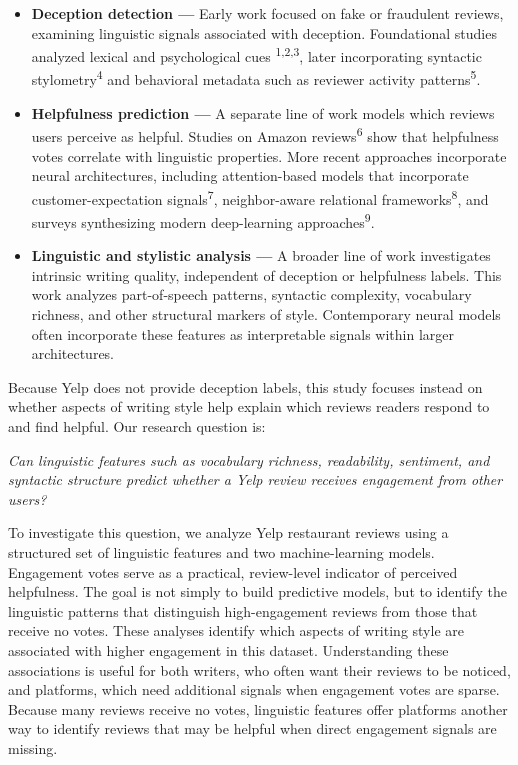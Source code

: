 \documentclass[12pt]{article}
\begin{document}
\begin{itemize}

  
\item \textbf{Deception detection —}
Early work focused on fake or fraudulent reviews, examining linguistic signals associated with deception. Foundational studies analyzed lexical and psychological cues \textsuperscript{1,2,3}, 
later incorporating syntactic stylometry\textsuperscript{4} and behavioral metadata such as reviewer activity patterns\textsuperscript{5}.

\item \textbf{Helpfulness prediction —}  
A separate line of work models which reviews users perceive as helpful. 
Studies on Amazon reviews\textsuperscript{6} show that helpfulness votes correlate with linguistic properties. 
More recent approaches incorporate neural architectures, including attention-based models that incorporate customer-expectation signals\textsuperscript{7},  
neighbor-aware relational frameworks\textsuperscript{8}, and surveys synthesizing modern deep-learning approaches\textsuperscript{9}.

\item \textbf{Linguistic and stylistic analysis —}  
A broader line of work investigates intrinsic writing quality, independent of deception or helpfulness labels. This work analyzes part-of-speech patterns, syntactic complexity, vocabulary richness, and other structural markers of style. Contemporary neural models often incorporate these features as interpretable signals within larger architectures.


\end{itemize}


Because Yelp does not provide deception labels, this study focuses instead on whether aspects of writing style help 
explain which reviews readers respond to and find helpful. Our research question is: 

\emph{Can linguistic features such as vocabulary richness, readability, sentiment, and syntactic structure predict whether a Yelp review receives engagement from other users?}

To investigate this question, we analyze Yelp restaurant reviews using a structured set of linguistic features and two machine-learning models.
 Engagement votes serve as a practical, review-level indicator of perceived helpfulness. The goal is not simply to build predictive models, 
 but to identify the linguistic patterns that distinguish high-engagement reviews from those that receive no votes. 
 These analyses identify which aspects of writing style are associated with higher engagement in this dataset. 
 Understanding these associations is useful for both writers, who often want their reviews to be noticed, and platforms, 
 which need additional signals when engagement votes are sparse. Because many reviews receive no votes, linguistic features offer platforms another way to identify reviews that may be helpful when direct engagement signals are missing.
\end{document}
